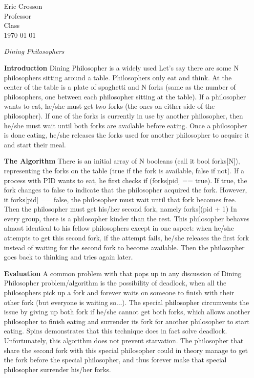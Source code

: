 \documentclass[12pt]{article}
\begin{document}
\begin{flushleft}
Eric Crosson \\
Professor \\
Class \\
\today \\

\begin{center}
\emph{Dining Philosophers}
\end{center}

\setlength{\parindent}{0.5in}

\textbf{Introduction}
\newline
Dining Philosopher is a widely used Let’s say there are some N philosophers sitting around a table. Philosophers only eat and think. At the center of the table is a plate of spaghetti and N forks (same as the number of philosophers, one between each philosopher sitting at the table). If a philosopher wants to eat, he/she must get two forks (the ones on either side of the philosopher). If one of the forks is currently in use by another philosopher, then he/she must wait until both forks are available before eating. Once a philosopher is done eating, he/she releases the forks used for another philosopher to acquire it and start their meal.

\textbf{The Algorithm}
\newline
There is an initial array of N booleans (call it bool forks[N]), representing the forks on the table (true if the fork is available, false if not). If a process with PID wants to eat, he first checks if (forks[pid] == true). If true, the fork changes to false to indicate that the philosopher acquired the fork. However, it forks[pid] ==  false, the philosopher must wait until that fork becomes free. Then the philosopher must get his/her second fork, namely forks[(pid + 1) %
In every group, there is a philosopher kinder than the rest. This philosopher behaves almost identical to his fellow philosophers except in one aspect: when he/she attempts to get this second fork, if the attempt fails, he/she releases the first fork instead of waiting for the second fork to become available. Then the philosopher goes back to thinking and tries again later.

\textbf{Evaluation}
\newline
A common problem with that pops up in any discussion of Dining Philosopher problem/algorithm is the possibility of deadlock, when all the philosophers pick up a fork and forever waits on someone to finish with their other fork (but everyone is waiting so...). The special philosopher circumvents the issue by giving up both fork if he/she cannot get both forks, which allows another philosopher to finish eating and surrender its fork for another philosopher to start eating. Spins demonstrates that this technique does in fact solve deadlock.
Unfortunately, this algorithm does not prevent starvation. The philosopher that share the second fork with this special philosopher could in theory manage to get the fork before the special philosopher, and thus forever make that special philosopher surrender his/her forks.


\end{flushleft}
\end{document}
